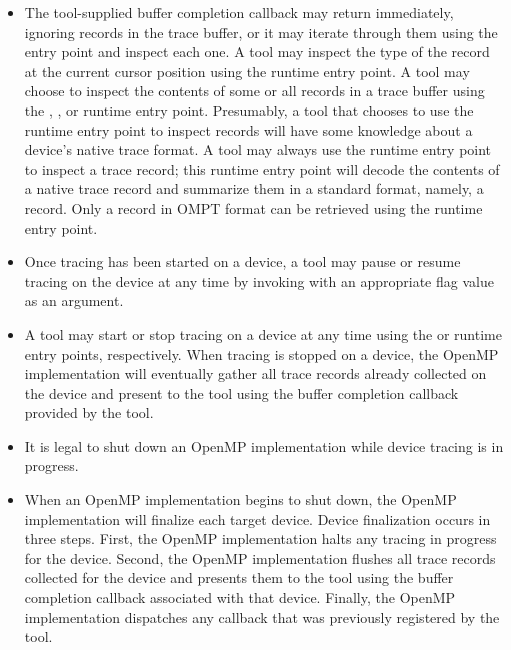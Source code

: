 \begin{itemize}
\item The tool-supplied buffer completion callback may return
  immediately, ignoring records in the trace buffer, or it may iterate
  through them using the  entry
  point
  and inspect each one. A tool may inspect the type of the record at
  the current cursor position using the 
  runtime entry point.  A tool may choose to inspect the contents of some or
  all records in a trace buffer using the ,
  , or
   runtime entry point.  Presumably, a tool that
  chooses to use the  runtime entry point to
  inspect records will have some knowledge about a device's native
  trace format.  A tool may always use the
   runtime entry point to inspect a trace
  record; this runtime entry point will decode the contents of a native trace record
  and summarize them in a standard format, namely, a
   record.
  Only a record in OMPT format can be retrieved using the
   runtime entry point.
\item Once tracing has been started on a device, a tool may pause or resume
  tracing on the device at any time by invoking
   with an appropriate flag value as an
  argument.  
\item A tool may start or stop tracing on a device at any time using the 
   or  runtime entry points,
  respectively. When tracing is stopped on a device, the OpenMP implementation will eventually 
  gather all trace records already collected on the device and present to the tool using
  the buffer completion callback provided by the tool.
\item It is legal to shut down an OpenMP implementation while device tracing 
is in progress.  
\item When an OpenMP implementation begins to shut down, the OpenMP implementation will 
  finalize each target device.  Device finalization occurs in three steps.
  First, the OpenMP implementation halts any tracing in progress for the device. Second,
  the OpenMP implementation flushes all trace records collected for the device and presents them to
  the tool using the buffer completion callback associated with that device. 
  Finally, the OpenMP implementation dispatches 
  any  callback that was previously 
  registered by the tool.

\end{itemize}


